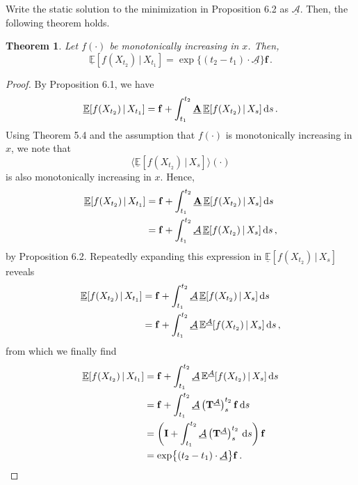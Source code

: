 \documentclass[10pt]{article}
\newtheorem{theorem}{Theorem}[section]
\newcommand{\dx}[1][x]{\text{\,d}#1}
\begin{document}
\newpage
Write the static solution to the minimization in Proposition 6.2 as $\underline{\mathcal{A}}$. Then, the following theorem holds.
\begin{theorem}
Let $f(\cdot)$ be monotonically increasing in $x$. Then,
\begin{equation*}
\underline{\mathbb{E}}[f(X_{t_2})\,\vert\,X_{t_1}] = \exp\bigl\{(t_2-t_1)\cdot\underline{\mathcal{A}}\bigr\}\mathbf{f}\,.
\end{equation*}
\end{theorem}
\begin{proof}
By Proposition 6.1, we have
\begin{equation*}
\underline{\mathbb{E}}[f(X_{t_2})\,\vert\,X_{t_1}] = \mathbf{f} + \int_{t_1}^{t_2}\underline{\mathbf{A}}\,\underline{\mathbb{E}}[f(X_{t_2})\,\vert\,X_s]\dx[s]\,.
\end{equation*}
Using Theorem 5.4 and the assumption that $f(\cdot)$ is monotonically increasing in $x$, we note that
\begin{equation*}
\bigl\langle\underline{\mathbb{E}}[f(X_{t_2})\,\vert\,X_s]\bigr\rangle(\cdot)
\end{equation*}
is also monotonically increasing in $x$. Hence,
\begin{align*}
\underline{\mathbb{E}}[f(X_{t_2})\,\vert\,X_{t_1}] &= \mathbf{f} + \int_{t_1}^{t_2}\underline{\mathbf{A}}\,\underline{\mathbb{E}}[f(X_{t_2})\,\vert\,X_s]\dx[s] \\
 &= \mathbf{f} + \int_{t_1}^{t_2}\underline{\mathcal{A}}\,\underline{\mathbb{E}}[f(X_{t_2})\,\vert\,X_s]\dx[s]\,,
\end{align*}
by Proposition 6.2. Repeatedly expanding this expression in $\underline{\mathbb{E}}[f(X_{t_2})\,\vert\,X_s]$ reveals
\begin{align*}
\underline{\mathbb{E}}[f(X_{t_2})\,\vert\,X_{t_1}] &= \mathbf{f} + \int_{t_1}^{t_2}\underline{\mathcal{A}}\,\underline{\mathbb{E}}[f(X_{t_2})\,\vert\,X_s]\dx[s] \\
 &= \mathbf{f} + \int_{t_1}^{t_2}\underline{\mathcal{A}}\,\mathbb{E}^{\underline{\mathcal{A}}}[f(X_{t_2})\,\vert\,X_s]\dx[s]\,,
\end{align*}
from which we finally find
\begin{align*} 
\underline{\mathbb{E}}[f(X_{t_2})\,\vert\,X_{t_1}] &= \mathbf{f} + \int_{t_1}^{t_2}\underline{\mathcal{A}}\,\mathbb{E}^{\underline{\mathcal{A}}}[f(X_{t_2})\,\vert\,X_s]\dx[s] \\
 &= \mathbf{f} + \int_{t_1}^{t_2}\underline{\mathcal{A}}\left(\mathbf{T}^{\underline{\mathcal{A}}}\right)_s^{t_2}\mathbf{f}\dx[s] \\
 &= \left(\mathbf{I} + \int_{t_1}^{t_2}\underline{\mathcal{A}}\left(\mathbf{T}^{\underline{\mathcal{A}}}\right)_s^{t_2}\dx[s]\right)\mathbf{f} \\
 &= \exp\bigl\{(t_2-t_1)\cdot\underline{\mathcal{A}}\bigr\}\mathbf{f}\,.
\end{align*}
\end{proof}
\end{document}

